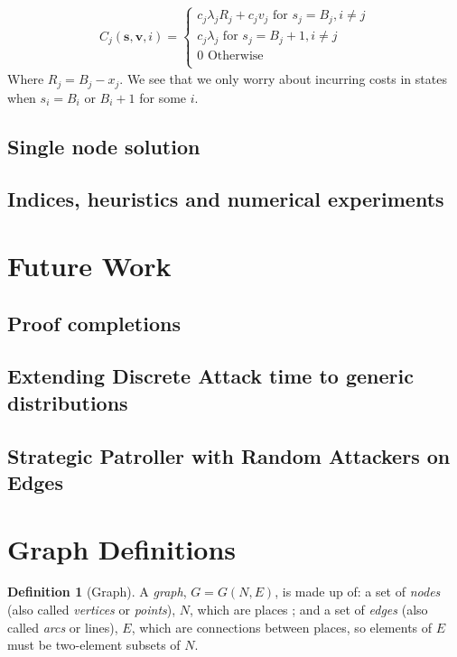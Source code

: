 \documentclass[a4paper,10pt]{article}
\theoremstyle{definition}
\newtheorem{definition}[theorem]{Definition}
\theoremstyle{definition}
\theoremstyle{remark}
\theoremstyle{definition}
\begin{document}
\begin{align*}
C_{j}(\bm{s},\bm{v},i)=\begin{cases}
c_{j} \lambda_{j} R_{j} + c_{j} v_{j}  \text{ for } s_{j}=B_{j},i \neq j \\ 
c_{j} \lambda_{j} \text{ for } s_{j}=B_{j}+1,i \neq j  \\
0 \text{ Otherwise} \\
\end{cases}
\end{align*}
Where $R_{j}=B_{j}-x_{j}$. We see that we only worry about incurring costs in states when $s_{i}=B_{i}$ or $B_{i}+1$ for some $i$.


\subsection{Single node solution}
\subsection{Indices, heuristics and numerical experiments}

\section{Future Work}
\subsection{Proof completions}
\subsection{Extending Discrete Attack time to generic distributions}
\subsection{Strategic Patroller with Random Attackers on Edges}



\newpage
\appendix
{}
\appendixpage
\addappheadtotoc
\section{Graph Definitions}
\label{Appendix:Graph Definitions}
\begin{definition}[Graph]
A \textit{graph}, $G=G(N,E)$, is made up of: a set of \textit{nodes} (also called \textit{vertices} or \textit{points}), $N$, which are places ; and a set of \textit{edges} (also called \textit{arcs} or lines), $E$, which are connections between places, so elements of $E$ must be two-element subsets of $N$.
\end{definition}
\end{document}
